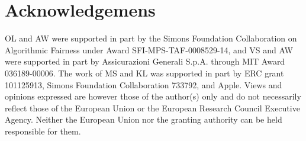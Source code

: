 \documentclass[11pt]{article}
\theoremstyle{definition}
\theoremstyle{plain}
\begin{document}
\section{Acknowledgemens}
OL and AW were supported in part by the Simons Foundation Collaboration on Algorithmic Fairness under Award SFI-MPS-TAF-0008529-14, and VS and AW were supported in part by Assicurazioni Generali S.p.A. through MIT Award 036189-00006.
The work of MS and KL was supported in part by ERC grant 101125913, Simons Foundation Collaboration 733792, and Apple. Views and opinions expressed are however those of the author(s) only and do not necessarily reflect those of the European Union or the European Research Council Executive Agency. Neither the European Union nor the granting authority can be held responsible for them.


\clearpage        %


\appendix

\newpage 
\end{document}
